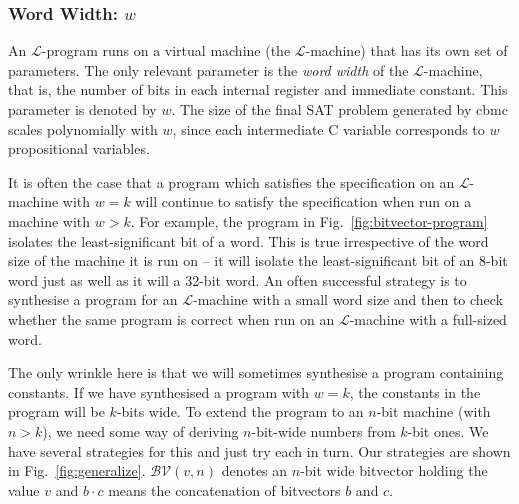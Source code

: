 \subsubsection{Word Width: $w$}
An $\mathcal{L}$-program runs on a virtual machine (the $\mathcal{L}$-machine) that
has its own set of parameters.  The only relevant parameter is
the \emph{word width} of the $\mathcal{L}$-machine, that is, the number of bits
in each internal register and immediate constant.  This parameter is denoted by
$w$.  The size of the final SAT problem generated by {\sc cbmc} scales
polynomially with $w$, since each intermediate C variable corresponds
to $w$ propositional variables.

It is often the case that a program which satisfies the specification
on an $\mathcal{L}$-machine with $w = k$ will continue to satisfy the
specification when run on a machine with $w > k$.  For example, the program
in Fig.~\ref{fig:bitvector-program} isolates the least-significant bit of a word.
This is true irrespective of the word size of the machine it is run on -- it will
isolate the least-significant bit of an 8-bit word just as well as it will a
32-bit word.  An often successful strategy is to synthesise a program for an
$\mathcal{L}$-machine with a small word size and then to check whether the
same program is correct when run on an $\mathcal{L}$-machine with a
full-sized word.

The only wrinkle here is that we will sometimes synthesise a program containing
constants.  If we have synthesised a program with $w=k$,
the constants in the program will be $k$-bits wide.  To extend the program
to an $n$-bit machine (with $n > k$), we need some way of deriving $n$-bit-wide
numbers from $k$-bit ones.  We have several strategies for this and
just try each in turn.  Our strategies are shown in Fig.~\ref{fig:generalize}.
$\mathcal{BV}(v, n)$ denotes an $n$-bit wide bitvector holding the value $v$
and $b \cdotp c$ means the concatenation of bitvectors $b$ and $c$.

